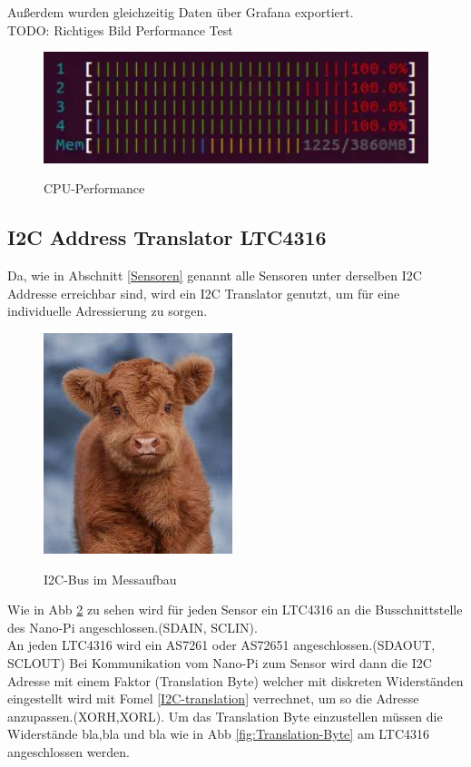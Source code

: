 Außerdem wurden gleichzeitig Daten über Grafana exportiert.\\
TODO: Richtiges Bild Performance Test\\
\begin{figure}[H]
  \centering
  \caption{CPU-Performance}
 \includegraphics[width=0.7\linewidth]{img/CPU-Performance.png}
  \label{fig:CPU-Performance}
\end{figure}

\subsection{I2C Address Translator LTC4316}\label{I2C-Translator}
Da, wie in Abschnitt \ref{Sensoren} genannt alle Sensoren unter derselben I2C Addresse erreichbar sind, wird ein I2C Translator genutzt, um für eine individuelle Adressierung zu sorgen.\\

\begin{figure}[H]
  \centering
  \caption{I2C-Bus im Messaufbau}
 \includegraphics[width=0.4\linewidth]{img/test.jpg}
  \label{fig:adress-translation}
\end{figure}
\noindent Wie in Abb \ref{fig:adress-translation} zu sehen wird für jeden Sensor ein LTC4316 an die Busschnittstelle des Nano-Pi angeschlossen.(SDAIN, SCLIN).\\ 
An jeden LTC4316 wird ein AS7261 oder AS72651 angeschlossen.(SDAOUT, SCLOUT)
Bei Kommunikation vom Nano-Pi zum Sensor wird dann die I2C Adresse mit einem Faktor (Translation Byte) welcher mit diskreten Widerständen eingestellt wird mit Fomel \ref{I2C-translation} verrechnet, um so die Adresse anzupassen.(XORH,XORL).
Um das Translation Byte einzustellen müssen die Widerstände bla,bla und bla wie in Abb \ref{fig:Translation-Byte} am LTC4316 angeschlossen werden.


